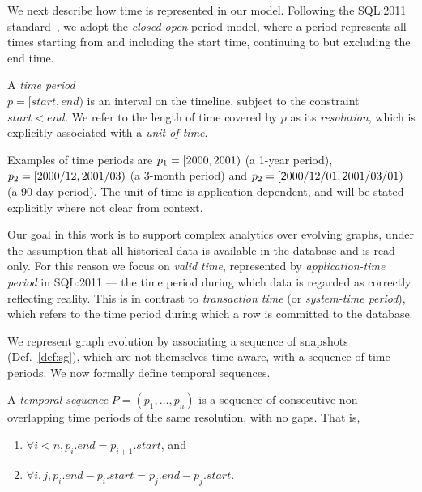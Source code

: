 We next describe how time is represented in our model.  Following the
SQL:2011 standard~\cite{DBLP:journals/sigmod/KulkarniM12}, we adopt
the {\em closed-open} period model, where a period represents all
times starting from and including the start time, continuing to but
excluding the end time.

\begin{definition}
A {\em time period} \\$p = [start, end)$ is an interval on the
  timeline, subject to the constraint $start < end$.  We refer to the
  length of time covered by $p$ as its {\em resolution}, which is
  explicitly associated with a {\em unit of time}.
\label{def:period} 
\end{definition}

Examples of time periods are $p_1=[2000,2001)$ (a 1-year
  period), $p_2=[2000/12,2001/03)$ (a 3-month period)
    and $p_2=[\mathsf 2000/12/01,\mathsf 2001/03/01)$ (a 90-day
      period).  The unit of time is application-dependent, and will be
      stated explicitly where not clear from context.

Our goal in this work is to support complex analytics over evolving
graphs, under the assumption that all historical data is available in
the database and is read-only.  For this reason we focus on {\em valid
  time}, represented by {\em application-time period} in SQL:2011 ---
the time period during which data is regarded as correctly reflecting
reality.  This is in contrast to {\em transaction time} (or {\em
  system-time period}), which refers to the time period during which a
row is committed to the database.

We represent graph evolution by associating a sequence of snapshots
(Def.~\ref{def:sg}), which are not themselves time-aware, with a
sequence of time periods.  We now formally define temporal sequences.

\begin{definition} 
A {\em temporal sequence} $P = (p_1, \ldots, p_n)$ is a
sequence of consecutive non-overlapping time periods of the same
resolution, with no gaps.  That is,

\begin{enumerate}
\item $\forall i < n, p_i.end = p_{i+1}.start$, and 
\item $\forall i, j, p_i.end - p_i.start = p_j.end - p_j.start$.
\end{enumerate}
\label{def:tseq} 
\end{definition}

